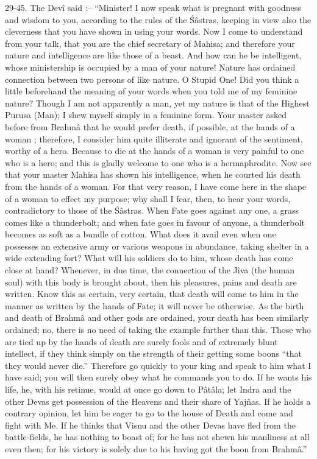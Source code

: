 29-45. The Dev\^i said :-- ``Minister! I now speak what is pregnant with goodness and wisdom to you, according to the rules of the \'S\^astras, keeping in view also the cleverness that you have shown in using your words. Now I come to understand from your talk, that you are the chief secretary of Mahisa; and therefore your nature and intelligence are like those of a beast. And how can he be intelligent, whose ministership is occupied by a man of your nature! Nature has ordained connection between two persons of like nature. O Stupid One! Did you think a little beforehand the meaning of your words when you told me of my feminine nature? Though I am not apparently a man, yet my nature is that of the Highest Purusa (Man); I shew myself simply in a feminine form. Your master asked before from Brahm\^a that he would prefer death, if possible, at the hands of a woman ; therefore, I consider him quite illiterate and ignorant of the sentiment, worthy of a hero. Because to die at the hands of a woman is very painful to one who is a hero; and this is gladly welcome to one who is a hermaphrodite. Now see that your master Mahisa has shown his intelligence, when he courted his death from the hands of a woman. For that very reason, I have come here in the shape of a woman to effect my purpose; why shall I fear, then, to hear your words, contradictory to those of the \'S\^astras. When Fate goes against any one, a grass comes like a thunderbolt; and when fate goes in favour of anyone, a thunderbolt becomes as soft as a bundle of cotton. What does it avail even when one possesses an extensive army or various weapons in abundance, taking shelter in a wide extending fort? What will his soldiers do to him, whose death has come close at hand? Whenever, in due time, the connection of the J\^iva (the human soul) with this body is brought about, then his pleasures, pains and death are written. Know this as certain, very certain, that death will come to him in the manner as written by the hands of Fate; it will never be otherwise. As the birth and death of Brahm\^a and other gods are ordained, your death has been similarly ordained; no, there is no need of taking the example further than this. Those who are tied up by the hands of death are surely fools and of extremely blunt intellect, if they think simply on the strength of their getting some boons ``that they would never die.'' Therefore go quickly to your king and speak to him what I have said; you will then surely obey what he commands you to do. If he wants his life, he, with his retinue, would at once go down to P\^at\^ala; let Indra and the other Devas get possession of the Heavens and their share of Yajñas. If he holds a contrary opinion, let him be eager to go to the house of Death and come and fight with Me. If he thinks that Visnu and the other Devas have fled from the battle-fields, he has nothing to boast of; for he has not shewn his manliness at all even then; for his victory is solely due to his having got the boon from Brahm\^a.''

